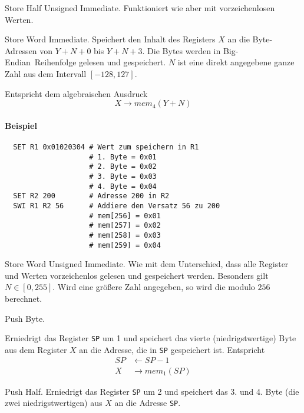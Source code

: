 \glqq Store Half Unsigned Immediate\grqq.
Funktioniert wie  aber mit vorzeichenlosen Werten.



\glqq Store Word Immediate\grqq.
Speichert den Inhalt des Registers $X$ an die Byte-Adressen von $Y+N+0$ bis 
$Y + N + 3$. Die Bytes werden in \glqq Big-Endian\grqq\ Reihenfolge gelesen und
gespeichert. $N$ ist eine direkt angegebene ganze Zahl aus dem Intervall 
$[-128, 127]$.

Entspricht dem algebraischen Ausdruck
\[
    X \to mem_{4}(Y + N)
\]

\paragraph{Beispiel}
\begin{lstlisting}
  SET R1 0x01020304 # Wert zum speichern in R1
                    # 1. Byte = 0x01
                    # 2. Byte = 0x02
                    # 3. Byte = 0x03
                    # 4. Byte = 0x04
  SET R2 200        # Adresse 200 in R2
  SWI R1 R2 56      # Addiere den Versatz 56 zu 200
                    # mem[256] = 0x01
                    # mem[257] = 0x02
                    # mem[258] = 0x03
                    # mem[259] = 0x04
\end{lstlisting}



\glqq Store Word Unsigned Immediate\grqq.
Wie  mit dem Unterschied, dass alle Register und Werten vorzeichenlos
gelesen und gespeichert werden. Besonders gilt $N \in [0, 255]$. Wird eine
größere Zahl angegeben, so wird die modulo $256$ berechnet.



\glqq Push Byte\grqq.

Erniedrigt das Register \texttt{SP} um 1 und speichert das vierte
(niedrigstwertige) Byte aus dem Register $X$ an die Adresse, die in \texttt{SP}
gespeichert ist.
Entspricht
\begin{align*}
  SP & \gets SP - 1    \\
  X  & \to mem_{1}(SP)
\end{align*}



\glqq Push Half\grqq.
Erniedrigt das Register \texttt{SP} um 2 und speichert das 3. und 4. Byte (die
zwei niedrigstwertigen) aus $X$ an die Adresse \texttt{SP}.

